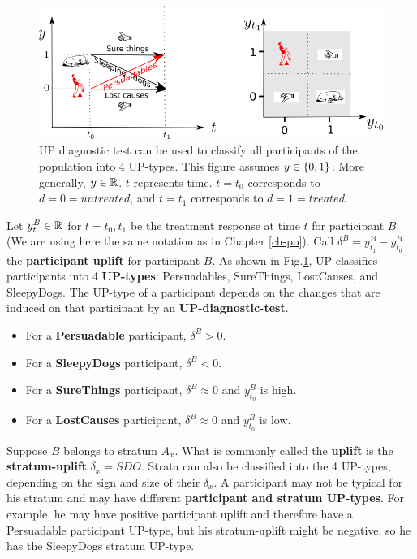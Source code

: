 \begin{figure}[h!]
\centering
\includegraphics[width=6in]
{uplift/uplift-y-t.png}
\caption{UP diagnostic test
can be used to classify
all participants of the
population into 4 UP-types.
This figure 
assumes $y\in \{0,1\}$.
More generally, $y\in { \mathbb{R}}$.
$t$ represents time. $t=t_0$
corresponds to $d=0=untreated$,
and $t=t_1$ corresponds to $d=1=treated$.} 
\label{fig-uplift-y-t}
\end{figure}

Let $y^B_t\in { \mathbb{R}}$ for $t=t_0, t_1$
be the treatment response at time $t$
for participant $B$. (We are using here
the same notation as in Chapter \ref{ch-po}).
Call $\delta^B=
y^B_{t_1}-y^B_{t_0}$ the {\bf participant uplift}
for participant $B$.
As shown
in Fig.\ref{fig-uplift-y-t},
UP classifies participants
into 4 {\bf UP-types}: Persuadables, SureThings, LostCauses,
and SleepyDogs.
The UP-type
of a participant
depends on the changes 
that are induced on that participant
by an {\bf UP-diagnostic-test}.
\begin{itemize}
\item
For a {\bf Persuadable} participant,
$\delta^B>0$.
\item
For a {\bf SleepyDogs}
participant, $\delta^B< 0$.
\item
For a {\bf SureThings} participant,
 $\delta^B\approx 0$
and $y^B_{t_0}$ is high.
\item
For a {\bf LostCauses} participant,
$\delta^B\approx 0$
and $y^B_{t_0}$ is low.
\end{itemize}


Suppose $B$
belongs to
stratum $A_x$.
What is commonly called 
the {\bf uplift} 
is the {\bf stratum-uplift} $\delta_x=SDO$.
Strata can also be
classified into
the 4 UP-types,
depending on the sign and size  
of their $\delta_x$.
A participant 
may not be typical for
his stratum
and may
have different
{\bf participant and stratum UP-types}.
For example, he may have positive 
participant uplift
and therefore have a Persuadable participant UP-type,
but his stratum-uplift
might be negative, so
he has
the SleepyDogs stratum UP-type.

